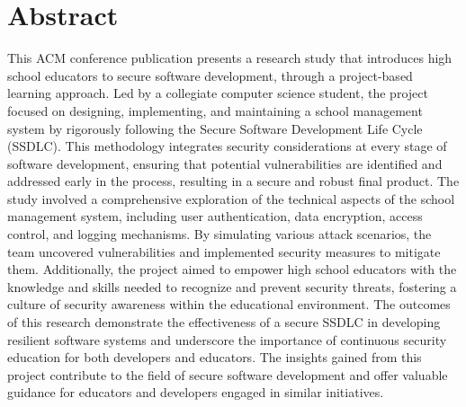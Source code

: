 \documentclass[letterpaper,twocolumn]{article}
\begin{document}
\section*{Abstract} %
This ACM conference publication presents a research study that introduces high school educators to secure software development, through a project-based learning approach. Led by a collegiate computer science student, the project focused on designing, implementing, and maintaining a school management system by rigorously following the Secure Software Development Life Cycle (SSDLC). This methodology integrates security considerations at every stage of software development, ensuring that potential vulnerabilities are identified and addressed early in the process, resulting in a secure and robust final product.
The study involved a comprehensive exploration of the technical aspects of the school management system, including user authentication, data encryption, access control, and logging mechanisms. By simulating various attack scenarios, the team uncovered vulnerabilities and implemented security measures to mitigate them. Additionally, the project aimed to empower high school educators with the knowledge and skills needed to recognize and prevent security threats, fostering a culture of security awareness within the educational environment.
The outcomes of this research demonstrate the effectiveness of a secure SSDLC in developing resilient software systems and underscore the importance of continuous security education for both developers and educators. The insights gained from this project contribute to the field of secure software development and offer valuable guidance for educators and developers engaged in similar initiatives.
\end{document}
